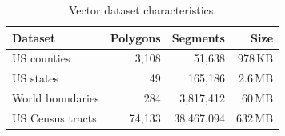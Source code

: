 \begin{table}[t]
\centering
\caption{Vector dataset characteristics.}
\label{tab:datasets}
\begin{tabular}{lrrr}
\toprule
\textbf{Dataset} & \textbf{Polygons} & \textbf{Segments} & \textbf{Size} \\
\midrule
US counties      & 3,108   & 51,638     & 978\,KB \\
US states        & 49      & 165,186    & 2.6\,MB \\
World boundaries & 284     & 3,817,412  & 60\,MB  \\
US Census tracts & 74,133  & 38,467,094 & 632\,MB \\
\bottomrule
\end{tabular}
\end{table}